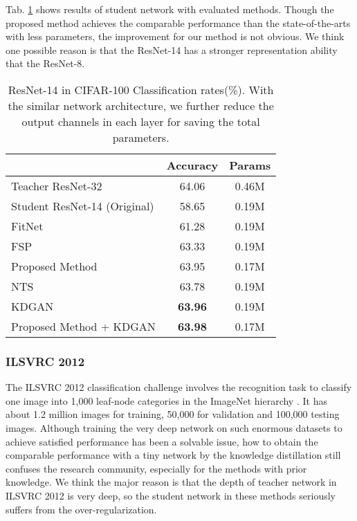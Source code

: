 \documentclass[10pt,twocolumn,letterpaper]{article}
\begin{document}
Tab. \ref{tab:cifar100} shows results of student network with evaluated methods.
Though the proposed method achieves the comparable performance
than the state-of-the-arts \cite{huang2017like, wang2018kdgan} with less parameters,
the improvement for our method is not obvious.
We think one possible reason is that
the ResNet-14 has a stronger representation ability that the ResNet-8.


\begin{table}[t]
\begin{center}
\begin{tabular}{l|c|c}
\hline
 & Accuracy & Params\\
\hline
Teacher ResNet-32 & 64.06 &  0.46M\\
Student ResNet-14 (Original) & 58.65 &  0.19M\\
FitNet \cite{Romero2014FitNets} & 61.28 &  0.19M\\
FSP \cite{yim2017gift} & 63.33 &  0.19M\\
Proposed Method & 63.95 &  0.17M\\
NTS \cite{huang2017like} & 63.78 &  0.19M\\
KDGAN \cite{wang2018kdgan} & \textbf{63.96} &  0.19M\\
Proposed Method + KDGAN \cite{wang2018kdgan}  & \textbf{63.98} &  0.17M\\
\hline
\end{tabular}
\end{center}
\caption{ResNet-14 in CIFAR-100 Classification rates(\%). With the similar network architecture, we further reduce the output channels in each layer for saving the total parameters.}
\label{tab:cifar100}
\end{table}



\subsubsection{ILSVRC 2012}
The ILSVRC 2012 classification challenge
involves the recognition task to classify one image into 1,000 leaf-node categories
in the ImageNet hierarchy \cite{Krizhevsky2012}.
It has about 1.2 million images for training,
50,000 for validation and 100,000 testing images.
Although training the very deep network on such enormous datasets
to achieve satisfied performance has been a solvable issue,
how to obtain the comparable performance with
a tiny network by the knowledge distillation
still confuses the research community,
especially for the methods \cite{luo2016face, Romero2014FitNets, yim2017gift} with prior knowledge.
We think the major reason is that
the depth of teacher network in ILSVRC 2012 is very deep,
so the student network in these methods seriously suffers from the over-regularization.
\end{document}
